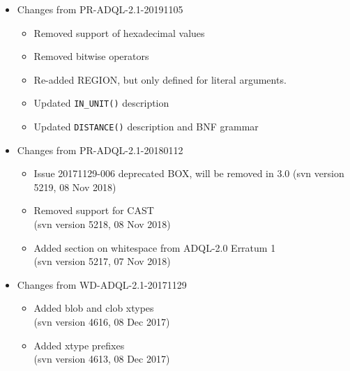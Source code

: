 \documentclass[11pt,a4paper]{ivoa}
\begin{document}
\begin{itemize}

    \item Changes from PR-ADQL-2.1-20191105
        \begin{itemize}
            \item Removed support of hexadecimal values
            \item Removed bitwise operators
            \item Re-added REGION, but only defined for literal
            arguments.
            \item Updated \verb:IN_UNIT(): description
            \item Updated \verb:DISTANCE(): description and BNF grammar
        \end{itemize}

    \item Changes from PR-ADQL-2.1-20180112
        \begin{itemize}
            \item Issue 20171129-006 deprecated BOX, will be removed in 3.0
            (svn version 5219, 08 Nov 2018)
            \item Removed support for CAST\\
            (svn version 5218, 08 Nov 2018)
            \item Added section on whitespace from ADQL-2.0 Erratum 1\\
            (svn version 5217, 07 Nov 2018)
        \end{itemize}

    \item Changes from WD-ADQL-2.1-20171129
        \begin{itemize}
            \item Added blob and clob xtypes\\
            (svn version 4616, 08 Dec 2017)
            \item Added xtype prefixes\\
            (svn version 4613, 08 Dec 2017)
        \end{itemize}


\end{itemize}
\end{document}
